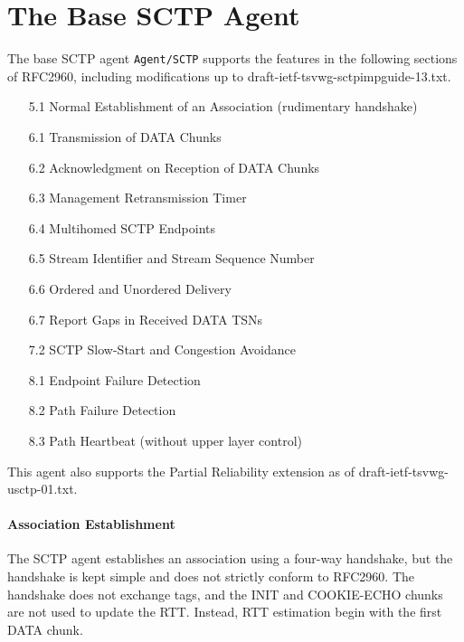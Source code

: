    \section{The Base SCTP Agent}
   \label{sec:baseSctp}

      The base SCTP agent {\tt Agent/SCTP} supports the features in the
      following sections of RFC2960, including modifications up to
      draft-ietf-tsvwg-sctpimpguide-13.txt.

      \begin{itemize}\itemsep0pt

	 \item[5.1] Normal Establishment of an Association (rudimentary
	 handshake)

	 \item[6.1] Transmission of DATA Chunks

	 \item[6.2] Acknowledgment on Reception of DATA Chunks

	 \item[6.3] Management Retransmission Timer

	 \item[6.4] Multihomed SCTP Endpoints

	 \item[6.5] Stream Identifier and Stream Sequence Number

	 \item[6.6] Ordered and Unordered Delivery 

	 \item[6.7] Report Gaps in Received DATA TSNs

	 \item[7.2] SCTP Slow-Start and Congestion Avoidance

	 \item[8.1] Endpoint Failure Detection

	 \item[8.2] Path Failure Detection

	 \item[8.3] Path Heartbeat (without upper layer control)

      \end{itemize}

      This agent also supports the Partial Reliability extension as of
      draft-ietf-tsvwg-usctp-01.txt.

      \paragraph{Association Establishment} The SCTP agent establishes an
      association using a four-way handshake, but the handshake is kept
      simple and does not strictly conform to RFC2960. The handshake does
      not exchange tags, and the INIT and COOKIE-ECHO chunks are not used
      to update the RTT.  Instead, RTT estimation begin with the first
      DATA chunk.


